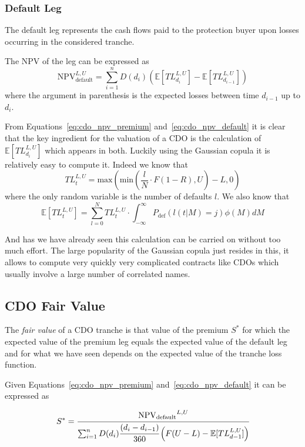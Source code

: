 \subsubsection{Default Leg}
The default leg represents the cash flows paid to the protection buyer upon losses occurring in the considered tranche. 

The NPV of the leg can be expressed as
\begin{equation}
\mathrm{NPV}_{\mathrm{default}}^{L,U}=\sum_{i=1}^{n}D(d_i)\left(\mathbb{E}[TL_{d_i}^{L,U}]-\mathbb{E}[TL_{d_{i-1}}^{L,U}]\right)
\label{eq:cdo_npv_default}
\end{equation}
where the argument in parenthesis is the expected losses between time $d_{i-1}$ up to $d_i$. 

From Equations~\ref{eq:cdo_npv_premium} and~\ref{eq:cdo_npv_default} it is clear that the key ingredient for the valuation of a CDO is the calculation of $\mathbb{E}[TL_{d_i}^{L,U}]$ which appears in both. Luckily using the Gaussian copula it is relatively easy to compute it. Indeed we know that 
\begin{equation}
TL_{t}^{L,U}=\mathrm{max}(\mathrm{min}(\frac{l}{N}\cdot F(1-R), U)-L, 0)
\label{eq:tl}
\end{equation}
where the only random variable is the number of defaults $l$. We also know that 
\begin{equation}
\mathbb{E}[TL_{t}^{L,U}] = \sum_{l=0}^{N}TL_{t}^{L,U}\cdot \int_{-\infty}^{\infty} P_{\mathrm{def}}(l(t|M)=j) \phi(M)dM
\label{eq:etl}
\end{equation}

And has we have already seen this calculation can be carried on without too much effort. The large popularity of the Gaussian copula just resides in this, it allows to compute very quickly very complicated contracts like CDOs which usually involve a large number of correlated names.

\subsection{CDO Fair Value}
The \emph{fair value} of a CDO tranche is that value of the premium $S^*$ for which the expected value of the premium leg equals the expected value of the default leg and for what we have seen depends on the expected value of the tranche loss function.

Given Equations~\ref{eq:cdo_npv_premium} and~\ref{eq:cdo_npv_default} it can be expressed as

\begin{equation}
S^* = \cfrac{\mathrm{NPV_{default}}^{L,U}}{\sum^{n}_{i=1}D(d_i)\cfrac{(d_i - d_{i-1})}{360}\left(F(U-L)-\mathbb{E}[TL_{d-1}^{L,U}]\right)}
\label{eq:cdo_fair_value}
\end{equation}

